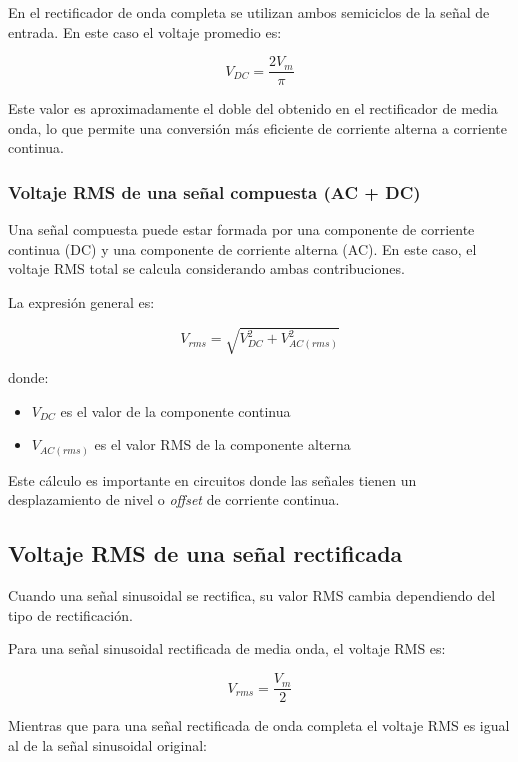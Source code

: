 \documentclass[journal]{IEEEtran}
\begin{document}
En el rectificador de onda completa se utilizan ambos semiciclos de la señal de entrada. En este caso el voltaje promedio es:

\begin{equation}
V_{DC} = \frac{2V_m}{\pi}
\end{equation}

Este valor es aproximadamente el doble del obtenido en el rectificador de media onda, lo que permite una conversión más eficiente de corriente alterna a corriente continua.

\subsubsection{Voltaje RMS de una señal compuesta (AC + DC)}

Una señal compuesta puede estar formada por una componente de corriente continua (DC) y una componente de corriente alterna (AC). En este caso, el voltaje RMS total se calcula considerando ambas contribuciones.

La expresión general es:

\begin{equation}
V_{rms} = \sqrt{V_{DC}^{2} + V_{AC(rms)}^{2}}
\end{equation}

donde:

\begin{itemize}
\item $V_{DC}$ es el valor de la componente continua
\item $V_{AC(rms)}$ es el valor RMS de la componente alterna
\end{itemize}

Este cálculo es importante en circuitos donde las señales tienen un desplazamiento de nivel o \textit{offset} de corriente continua.

\subsection{Voltaje RMS de una señal rectificada}

Cuando una señal sinusoidal se rectifica, su valor RMS cambia dependiendo del tipo de rectificación.

Para una señal sinusoidal rectificada de media onda, el voltaje RMS es:

\begin{equation}
V_{rms} = \frac{V_m}{2}
\end{equation}

Mientras que para una señal rectificada de onda completa el voltaje RMS es igual al de la señal sinusoidal original:
\end{document}
